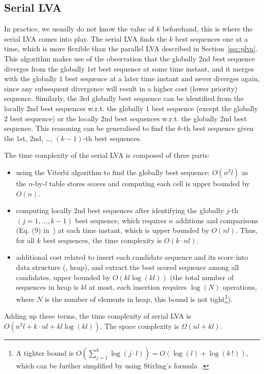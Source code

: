 \subsection{Serial LVA}
\label{sec:slva}

In practice, we usually do not know the value of $k$ beforehand, this is where the serial LVA comes into play.
The serial LVA finds the $k$ best sequences one at a time, which is more flexible than the parallel LVA described in Section~\ref{sec:plva}.
This algorithm makes use of the observation that the globally $2$nd best sequence diverges from the globally $1$st best sequence 
at some time instant, and it merges with the globally $1$ best sequence at a later time instant and never diverges again, 
since any subsequent divergence will result in a higher cost (lower priority) sequence.
Similarly, the $3$rd globally best sequence can be identified from the locally $2$nd best sequences w.r.t. the globally $1$ best sequence 
(except the globally $2$ best sequence) or the locally $2$nd best sequences w.r.t. the globally $2$nd best sequence.
This reasoning can be generalised to find the $k$-th best sequence given the $1$st, $2$nd, \dots, $(k-1)$-th best sequences.

The time complexity of the serial LVA is composed of three parts:
\begin{itemize}
\item using the Viterbi algorithm to find the globally best sequence: $O(n^2 l)$ as the $n$-by-$l$ table stores scores and 
      computing each cell is upper bounded by $O(n)$.
\item computing locally $2$nd best sequences after identifying the globally $j$-th $(j=1,\dots,k-1)$ best sequence, 
      which requires $n$ additions and comparisons (Eq. (9) in~\cite{seshadri1994list}) at each time instant, 
      which is upper bounded by $O(nl)$. Thus, for all $k$ best sequences, the time complexity is $O (k \cdot nl)$.
\item additional cost related to insert each candidate sequence and its score into data structure (\eg, heap), 
      and extract the best scored sequence among all candidates, upper bounded by $O \left( kl \log (kl) \right)$ 
      (the total number of sequences in heap is $kl$ at most, each insertion requires $\log (N)$ operations, 
       where $N$ is the number of elements in heap, 
       this bound is not tight\footnote{A tighter bound is 
       $O \left( \sum_{j=1}^k \log(j\cdot l) \right) = O( \log(l) + \log(k\,!) )$, 
       which can be further simplified by using Stirling's formula~\cite{stirling}.\label{foot:bound}}).
\end{itemize}
Adding up these terms, the time complexity of serial LVA is $O \left( n^2 l + k \cdot nl + kl \log (kl) \right)$.
The space complexity is $\Omega(nl + kl)$.


